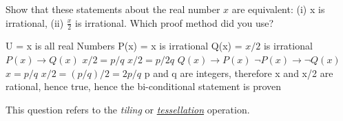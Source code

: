 \documentclass[addpoints]{exam}
\begin{document}
\begin{questions}
\question[5]
  Show that these statements about the real number $x$ are equivalent: (i) x is irrational, (ii)  $\frac{x}{2}$ is irrational. Which proof method did you use?

  \begin{solution}
    U = x is all real Numbers
    \newline P(x) = x is irrational 
    \newline Q(x) = $x/2$ is irrational
    \newline
    \newline $P(x) \rightarrow Q(x)$
    \newline $x/2 = p/q$
    \newline $x/2 = p/2q$
    \newline
    \newline $Q(x) \rightarrow P(x)$
    \newline $\neg P(x) \rightarrow \neg Q(x)$
    \newline $x = p/q$
    \newline $x/2 = (p/q)/2 = 2p/q$
    \newline
    \newline p and q are integers, therefore x and x/2 are rational, hence true,
    \newline hence the bi-conditional statement is proven
  \end{solution}

\question This question refers to the \textit{tiling} or \href{https://en.wikipedia.org/wiki/Tessellation}{\textit{tessellation}} operation.
  

\end{questions}
\end{document}
